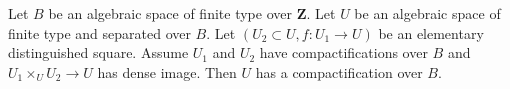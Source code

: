 %
\begin{lemma}
\label{lemma-two-compactifications}
Let $B$ be an algebraic space of finite type over $\mathbf{Z}$.
Let $U$ be an algebraic space of finite type and separated over $B$.
Let $(U_2 \subset U, f : U_1 \to U)$ be an
elementary distinguished square. Assume $U_1$ and $U_2$ have
compactifications over $B$ and $U_1 \times_U U_2 \to U$ has dense image.
Then $U$ has a compactification over $B$.
\end{lemma}

